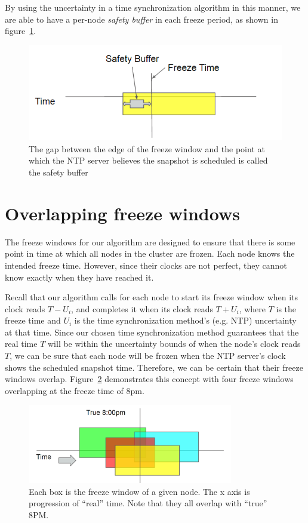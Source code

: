 By using the uncertainty in a time synchronization algorithm in this
manner, we are able to have a per-node \textit{safety buffer} in each
freeze period, as shown in figure~\ref{fig:safety-buff}.

\begin{figure}
\includegraphics{safety-diagram.png}
\caption{The gap between the edge of the freeze window and the point at which the NTP server believes the snapshot is scheduled is called the safety buffer}
\label{fig:safety-buff}
\end{figure}

\section{Overlapping freeze windows}

The freeze windows for our algorithm are designed to ensure
that there is some point in time at which all nodes in the cluster are
frozen. Each node knows the intended freeze time. However, since their
clocks are not perfect, they cannot know exactly when they have reached it.

Recall that our algorithm calls for each node to start its freeze
window when its clock reads $T - U_i$, and completes it when its clock
reads $T + U_i$, where $T$ is the freeze time and $U_i$ is the time
synchronization method's (e.g. NTP) uncertainty at that time.  Since
our chosen time synchronization method guarantees that the real time
$T$ will be within the uncertainty bounds of when the node's clock
reads $T$, we can be sure that each node will be frozen when the NTP
server's clock shows the scheduled snapshot time. Therefore, we can be
certain that their freeze windows overlap.
Figure~\ref{fig:overlapping-windows} demonstrates this concept with
four freeze windows overlapping at the freeze time of 8pm.

\begin{figure}[h]
  \centering
  \caption{ Each box is the freeze window of a given node. The x axis is progression of “real” time. Note that they all overlap with “true” 8PM.}
  \label{fig:overlapping-windows}
  \includegraphics[width=0.8\textwidth]{overlapping-windows.png}
\end{figure}
